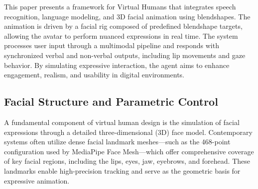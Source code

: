 \documentclass[runningheads]{llncs}
\begin{document}
This paper presents a framework for Virtual Humans that integrates speech recognition, language modeling, and 3D facial animation using blendshapes. The animation is driven by a facial rig composed of predefined blendshape targets, allowing the avatar to perform nuanced expressions in real time. The system processes user input through a multimodal pipeline and responds with synchronized verbal and non-verbal outputs, including lip movements and gaze behavior. By simulating expressive interaction, the agent aims to enhance engagement, realism, and usability in digital environments.




\subsection{Facial Structure and Parametric Control}

A fundamental component of virtual human design is the simulation of facial expressions through a detailed three-dimensional (3D) face model. Contemporary systems often utilize dense facial landmark meshes—such as the 468-point configuration used by MediaPipe Face Mesh—which offer comprehensive coverage of key facial regions, including the lips, eyes, jaw, eyebrows, and forehead. These landmarks enable high-precision tracking and serve as the geometric basis for expressive animation.
\end{document}
